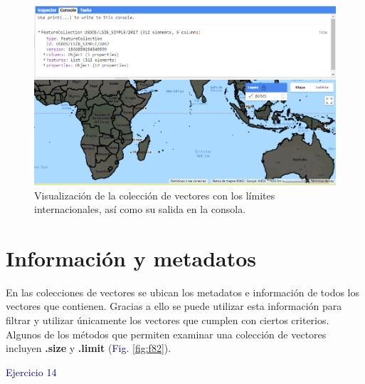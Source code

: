 \documentclass[
  12pt,
  letterpaper,
  twoside]{book}
\newcommand\boldpurple[1]{\textcolor{darkpurple}{\textbf{#1}}}
\begin{document}
\begin{figure}[H]

{\centering \includegraphics[width=0.95\linewidth]{Img/ej13} 

}

\caption{Visualización de la colección de vectores con los límites internacionales, así como su salida en la consola.}\label{fig:f81}
\end{figure}

\hypertarget{informaciuxf3n-y-metadatos-2}{%
\section{Información y metadatos}\label{informaciuxf3n-y-metadatos-2}}

En las colecciones de vectores se ubican los metadatos e información de todos los vectores que contienen. Gracias a ello se puede utilizar esta información para filtrar y utilizar únicamente los vectores que cumplen con ciertos criterios. Algunos de los métodos que permiten examinar una colección de vectores incluyen \boldpurple{.size} y \boldpurple{.limit} (\textcolor{darkblue}{Fig.} \ref{fig:f82}).

\textcolor{darkblue}{Ejercicio 14}
\end{document}
